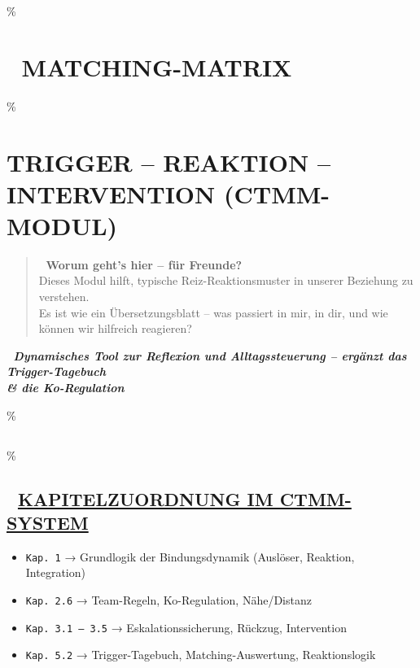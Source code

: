 \hypertarget{matching-matrix}{\%
\section{\texorpdfstring{🧩 \textbf{MATCHING-MATRIX}}{🧩 MATCHING-MATRIX}}\label{matching-matrix}}

\hypertarget{trigger-reaktion-intervention-ctmm-modul}{\%
\section{\texorpdfstring{\textbf{TRIGGER -- REAKTION -- INTERVENTION (CTMM-MODUL)}}{TRIGGER -- REAKTION -- INTERVENTION (CTMM-MODUL)}}\label{trigger-reaktion-intervention-ctmm-modul}}

\begin{quote}
🧠 \textbf{Worum geht's hier -- für Freunde?}\\
Dieses Modul hilft, typische Reiz-Reaktionsmuster in unserer Beziehung zu verstehen.\\
Es ist wie ein Übersetzungsblatt -- was passiert in mir, in dir, und wie können wir hilfreich reagieren?
\end{quote}

🧩 \emph{\textbf{Dynamisches Tool zur Reflexion und Alltagssteuerung -- ergänzt das Trigger-Tagebuch \\& die Ko-Regulation}}

\hypertarget{section}{\%
\subsection{}\label{section}}

\hypertarget{kapitelzuordnung-im-ctmm-system}{\%
\subsection{\texorpdfstring{📘 \textbf{\ul{KAPITELZUORDNUNG IM CTMM-SYSTEM}}}{📘 KAPITELZUORDNUNG IM CTMM-SYSTEM}}\label{kapitelzuordnung-im-ctmm-system}}

\begin{itemize}
\tightlist
\item
  \texttt{Kap.\ }\texttt{1} → Grundlogik der Bindungsdynamik (Auslöser, Reaktion, Integration)
\item
  \texttt{Kap.\ }\texttt{2.6} → Team-Regeln, Ko-Regulation, Nähe/Distanz
\item
  \texttt{Kap.\ }\texttt{3.1\ –\ 3.5} → Eskalationssicherung, Rückzug, Intervention
\item
  \texttt{Kap.\ }\texttt{5.2} → Trigger-Tagebuch, Matching-Auswertung, Reaktionslogik
\end{itemize}

